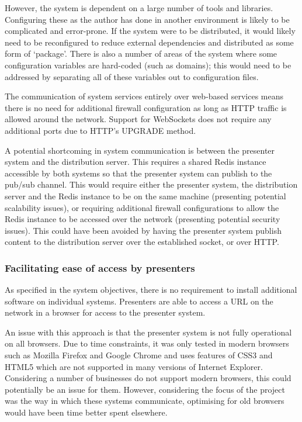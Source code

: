 \documentclass[a4papert,11pt,notitlepage]{article}
\begin{document}
However, the system is dependent on a large number of tools and libraries. Configuring these as the author has done in another environment is likely to be complicated and error-prone. If the system were to be distributed, it would likely need to be reconfigured to reduce external dependencies and distributed as some form of `package'. There is also a number of areas of the system where some configuration variables are hard-coded (such as domains); this would need to be addressed by separating all of these variables out to configuration files.

The communication of system services entirely over web-based services means there is no need for additional firewall configuration as long as HTTP traffic is allowed around the network. Support for WebSockets does not require any additional ports due to HTTP's UPGRADE method. 

A potential shortcoming in system communication is between the presenter system and the distribution server. This requires a shared Redis instance accessible by both systems so that the presenter system can publish to the pub/sub channel. This would require either the presenter system, the distribution server and the Redis instance to be on the same machine (presenting potential scalability issues), or requiring additional firewall configurations to allow the Redis instance to be accessed over the network (presenting potential security issues). This could have been avoided by having the presenter system publish content to the distribution server over the established socket, or over HTTP.

\subsubsection{Facilitating ease of access by presenters}
As specified in the system objectives, there is no requirement to install additional software on individual systems. Presenters are able to access a URL on the network in a browser for access to the presenter system. 

An issue with this approach is that the presenter system is not fully operational on all browsers. Due to time constraints, it was only tested in modern browsers such as Mozilla Firefox and Google Chrome and uses features of CSS3 and HTML5 which are not supported in many versions of Internet Explorer. Considering a number of businesses do not support modern browsers, this could potentially be an issue for them. However, considering the focus of the project was the way in which these systems communicate, optimising for old browsers would have been time better spent elsewhere.
\end{document}

